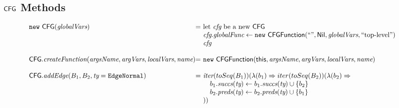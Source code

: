\subsection{$\mbox{\textsf{CFG}}$ Methods}
\[
\begin{array}{l@{}l@{~}l}
\new\ \CFG(\emph{globalVars})
& = & \text{let } \emph{cfg} \text{ be a new } \CFG\\
& & \emph{cfg}.\emph{globalFunc} \leftarrow \new\ \CFGFunction(``", \Nil, \emph{globalVars}, ``\text{top-level}")\\
& & \emph{cfg}\\
& & \\

\CFG.\emph{createFunction}(\emph{argsName}, \emph{argVars}, \emph{localVars}, \emph{name})
& = & \new\ \CFGFunction(\this, \emph{argsName}, \emph{argVars}, \emph{localVars}, \emph{name})\\
& & \\

\CFG.\emph{addEdge}(B_1, B_2, \emph{ty} = \EdgeNormal)
& = & \iter(toSeq(B_1))(\lambda(b_1) \Rightarrow iter(toSeq(B_2))(\lambda(b_2) \Rightarrow \\
& & \quad b_1.\emph{succs}(\emph{ty}) \leftarrow b_1.\emph{succs}(\emph{ty}) \cup \{b_2\} \\
& & \quad b_2.\emph{preds}(\emph{ty}) \leftarrow b_2.\emph{preds}(\emph{ty}) \cup \{b_1\} \\
& & )) \\
\end{array}
\]

